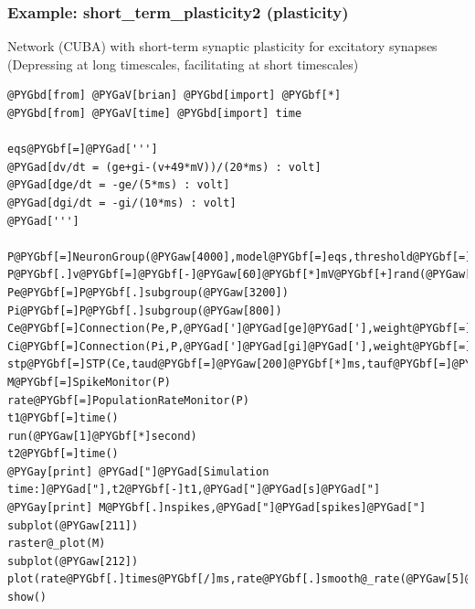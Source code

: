 \documentclass[letterpaper,10pt,english]{manual}
\begin{document}
\resetcurrentobjects
\hypertarget{--doc-examples-plasticity_short_term_plasticity2}{}

\hypertarget{index-100}{}\subsubsection{Example: short\_term\_plasticity2 (plasticity)}

Network (CUBA) with short-term synaptic plasticity for excitatory synapses
(Depressing at long timescales, facilitating at short timescales)

\begin{Verbatim}[commandchars=@\[\]]
@PYGbd[from] @PYGaV[brian] @PYGbd[import] @PYGbf[*]
@PYGbd[from] @PYGaV[time] @PYGbd[import] time

eqs@PYGbf[=]@PYGad[''']
@PYGad[dv/dt = (ge+gi-(v+49*mV))/(20*ms) : volt]
@PYGad[dge/dt = -ge/(5*ms) : volt]
@PYGad[dgi/dt = -gi/(10*ms) : volt]
@PYGad[''']

P@PYGbf[=]NeuronGroup(@PYGaw[4000],model@PYGbf[=]eqs,threshold@PYGbf[=]@PYGbf[-]@PYGaw[50]@PYGbf[*]mV,reset@PYGbf[=]@PYGbf[-]@PYGaw[60]@PYGbf[*]mV)
P@PYGbf[.]v@PYGbf[=]@PYGbf[-]@PYGaw[60]@PYGbf[*]mV@PYGbf[+]rand(@PYGaw[4000])@PYGbf[*]@PYGaw[10]@PYGbf[*]mV
Pe@PYGbf[=]P@PYGbf[.]subgroup(@PYGaw[3200])
Pi@PYGbf[=]P@PYGbf[.]subgroup(@PYGaw[800])
Ce@PYGbf[=]Connection(Pe,P,@PYGad[']@PYGad[ge]@PYGad['],weight@PYGbf[=]@PYGaw[1.62]@PYGbf[*]mV,sparseness@PYGbf[=]@PYGbf[.]@PYGaw[02])
Ci@PYGbf[=]Connection(Pi,P,@PYGad[']@PYGad[gi]@PYGad['],weight@PYGbf[=]@PYGbf[-]@PYGaw[9]@PYGbf[*]mV,sparseness@PYGbf[=]@PYGbf[.]@PYGaw[02])
stp@PYGbf[=]STP(Ce,taud@PYGbf[=]@PYGaw[200]@PYGbf[*]ms,tauf@PYGbf[=]@PYGaw[20]@PYGbf[*]ms,U@PYGbf[=]@PYGbf[.]@PYGaw[2])
M@PYGbf[=]SpikeMonitor(P)
rate@PYGbf[=]PopulationRateMonitor(P)
t1@PYGbf[=]time()
run(@PYGaw[1]@PYGbf[*]second)
t2@PYGbf[=]time()
@PYGay[print] @PYGad["]@PYGad[Simulation time:]@PYGad["],t2@PYGbf[-]t1,@PYGad["]@PYGad[s]@PYGad["]
@PYGay[print] M@PYGbf[.]nspikes,@PYGad["]@PYGad[spikes]@PYGad["]
subplot(@PYGaw[211])
raster@_plot(M)
subplot(@PYGaw[212])
plot(rate@PYGbf[.]times@PYGbf[/]ms,rate@PYGbf[.]smooth@_rate(@PYGaw[5]@PYGbf[*]ms))
show()
\end{Verbatim}

\resetcurrentobjects
\hypertarget{--doc-examples-plasticity_STDP1}{}
\end{document}
